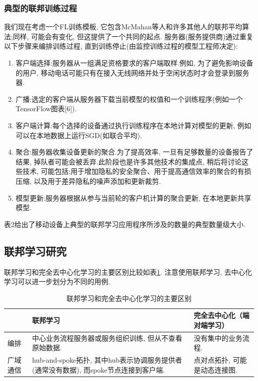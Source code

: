 \documentclass[a4paper]{article}
\theoremstyle{definition}
\numberwithin{equation}{section}
\begin{document}
\subsubsection{典型的联邦训练过程}
我们现在考虑一个FL训练模板, 它包含McMahan等人\citep{mcmahan2016communication}和许多其他人的联邦平均算法;同样, 可能会有变化, 但这提供了一个共同的起点.
服务器(服务提供商)通过重复以下步骤来编排训练过程, 直到训练停止(由监控训练过程的模型工程师决定):


\begin{enumerate}
\item 客户端选择:服务器从一组满足资格要求的客户端取样.例如, 为了避免影响设备的用户, 移动电话可能只有在接入无线网络并处于空闲状态时才会登录到服务器.
\item 广播:选定的客户端从服务器下载当前模型的权值和一个训练程序(例如一个TensorFlow图表[6]).
\item 客户端计算:每个选择的设备通过执行训练程序在本地计算对模型的更新, 例如可以在本地数据上运行SGD(如联合平均).
\item 聚合:服务器收集设备更新的聚合.为了提高效率, 一旦有足够数量的设备报告了结果, 掉队者可能会被丢弃.此阶段也是许多其他技术的集成点, 稍后将讨论这些技术, 可能包括:用于增加隐私的安全聚合、用于提高通信效率的聚合的有损压缩, 以及用于差异隐私的噪声添加和更新裁剪.
\item 模型更新:服务器根据从参与当前轮的客户机计算的聚合更新, 在本地更新共享模型.
\end{enumerate}
表2给出了移动设备上典型的联邦学习应用程序所涉及的数量的典型数量级大小.


\subsection{联邦学习研究} 

联邦学习和完全去中心化学习的主要区别比较如表\ref{tab:decentralized}.
注意使用联邦学习, 去中心化学习可以进一步划分为不同的用例.
\begin{table}
    \begin{centering}
    \renewcommand{\arraystretch}{1.5}
    \begin{tabularx}{\textwidth}{lXX}
    \toprule
           & \textbf{联邦学习} & \textbf{完全去中心化（端对端学习）} \\
    \midrule  
编排
&中心业务流程服务器或服务组织训练, 但从不查看原始数据.
&没有集中的业务流程.
\\
广域通信
& hub-and-spoke拓扑, 其中hub表示协调服务提供者(通常没有数据), 而spoke节点连接到客户端.
&点对点拓扑, 可能是动态连接图.
\\ 
    \bottomrule
    \end{tabularx}
    \caption{联邦学习和完全去中心化学习的主要区别}
    \label{tab:decentralized}
    \end{centering}
\end{table}
 
\end{document}
